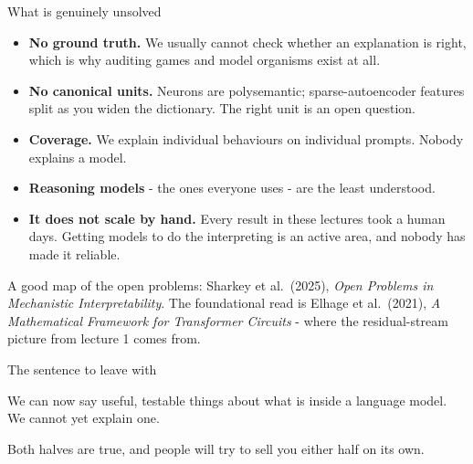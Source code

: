\documentclass[aspectratio=169]{beamer}
\begin{document}
\begin{frame}{What is genuinely unsolved}
  \vspace{0.7em}
  \begin{itemize}
    \item \textbf{No ground truth.} We usually cannot check whether an explanation is right,
      which is why auditing games and model organisms exist at all.
    \item \textbf{No canonical units.} Neurons are polysemantic; sparse-autoencoder features
      split as you widen the dictionary. The right unit is an open question.
    \item \textbf{Coverage.} We explain individual behaviours on individual prompts. Nobody
      explains a model.
    \item \textbf{Reasoning models} - the ones everyone uses - are the least understood.
    \item \textbf{It does not scale by hand.} Every result in these lectures took a human days.
      Getting models to do the interpreting is an active area, and nobody has made it reliable.
  \end{itemize}

  \vspace{0.6em}
  {\footnotesize A good map of the open problems: Sharkey et al.\ (2025), \emph{Open Problems in
  Mechanistic Interpretability}. The foundational read is Elhage et al.\ (2021),
  \emph{A Mathematical Framework for Transformer Circuits} - where the residual-stream picture
  from lecture 1 comes from.}
\end{frame}

\begin{frame}{The sentence to leave with}
  \vspace{1.6em}
  \begin{center}
  \begin{tcolorbox}[colback=armblue!8, colframe=armblue, boxrule=0.9pt, arc=3pt,
                    width=0.9\textwidth]
    \centering\large
    We can now say useful, testable things about what is inside a language model.\\[0.7em]
    We cannot yet explain one.
  \end{tcolorbox}
  \end{center}

  \vspace{1.6em}
  \begin{center}
    Both halves are true, and people will try to sell you either half on its own.
  \end{center}
\end{frame}
\end{document}
